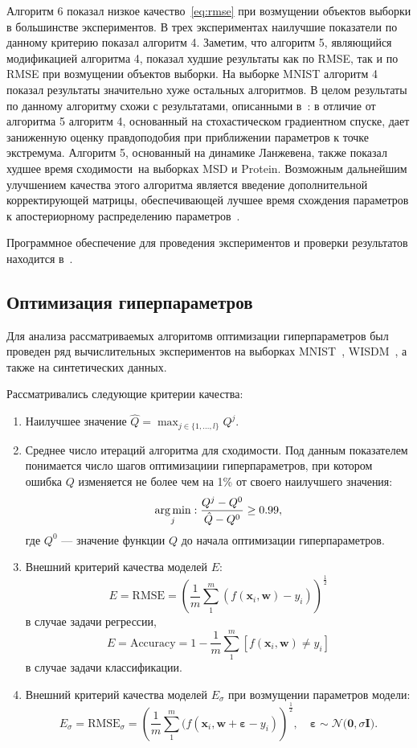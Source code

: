 Алгоритм 6 показал низкое качество~\eqref{eq:rmse} при возмущении объектов выборки {в большинстве экспериментов}. В {трех} экспериментах наилучшие показатели по данному критерию показал алгоритм 4. Заметим, что алгоритм 5, являющийся модификацией алгоритма 4, показал худшие результаты как по RMSE, так и по RMSE при возмущении объектов выборки. 
{На выборке MNIST алгоритм 4 показал результаты значительно хуже остальных алгоритмов. В целом результаты по данному алгоритму схожи с результатами, описанными в~\cite{early}: в отличие от алгоритма 5 алгоритм 4, основанный на стохастическом градиентном спуске, дает заниженную оценку правдоподобия при приближении параметров к точке экстремума. } Алгоритм 5, основанный на динамике Ланжевена, также показал худшее время сходимости~{на выборках MSD и Protein}. Возможным дальнейшим улучшением качества этого алгоритма является введение дополнительной корректирующей матрицы, обеспечивающей лучшее время схождения параметров к апостериорному распределению параметров~\cite{langevin}.

Программное обеспечение для проведения экспериментов и проверки результатов  находится в~\cite{my_src}. 





\subsection{Оптимизация гиперпараметров}
Для анализа рассматриваемых алгоритомв оптимизации гиперпараметров был проведен ряд вычислительных экспериментов на выборках MNIST~\cite{mnist}, WISDM~\cite{wisdm}, а также на синтетических данных.

Рассматривались следующие критерии качества:
\begin{enumerate}
\item Наилучшее значение $\hat{Q} = \max_{j \in \{1, \dots, l\}}Q^j$.
\item Среднее число итераций алгоритма для сходимости. Под данным показателем понимается число шагов оптимизациии гиперпараметров, при котором ошибка $Q$ изменяется не более чем на 1\% от своего наилучшего значения:
\[
    \operatorname*{arg\,min}_{j}: \frac{Q^j - Q^0}{\hat{Q} - Q^0} \geq 0.99,
\]
где $Q^0$ --- значение функции $Q$ до начала оптимизации гиперпараметров.

\item Внешний критерий качества моделей $E$:
\[
    E = \text{RMSE} = \left (\frac{1}{m}\sum_{1}^m (f(\mathbf{x}_i, \mathbf{w})-y_i)\right)^{\frac{1}{2}}
\]
в случае задачи регрессии,
\[
    E = \text{Accuracy} = 1 - \frac{1}{m}\sum_1^m [f(\mathbf{x}_i, \mathbf{w}) \neq y_i]
\]
в случае задачи классификации.

\item Внешний критерий качества моделей $E_\sigma$ при возмущении параметров модели:
\[
    E_\sigma = \text{RMSE}_\sigma = \left (\frac{1}{m}\sum_{1}^m (f(\mathbf{x}_i, \mathbf{w} + \boldsymbol{\varepsilon}-y_i)\right)^{\frac{1}{2}}, \quad \boldsymbol{\varepsilon} \sim \mathcal{N}\bigl(\mathbf{0}, \sigma\mathbf{I}\bigr).
\]
\end{enumerate}

